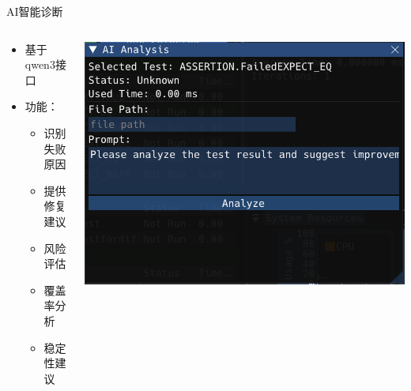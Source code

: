 \documentclass{beamer}
\begin{document}
\begin{frame}{AI智能诊断}
    \begin{columns}
        \begin{column}{0.5\textwidth}
            \begin{itemize}
                \item 基于qwen3接口
                \item 功能：
                      \begin{itemize}
                          \item 识别失败原因
                          \item 提供修复建议
                          \item 风险评估
                          \item 覆盖率分析
                          \item 稳定性建议
                      \end{itemize}
            \end{itemize}
        \end{column}
        \begin{column}{0.5\textwidth}
            \includegraphics[width=\textwidth]{img/aih.png}
        \end{column}
    \end{columns}
\end{frame}
\end{document}
